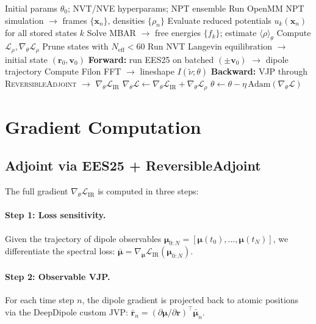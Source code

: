 \documentclass{article}
\newcommand{\RevAdj}{\textsc{ReversibleAdjoint}}
\begin{document}
\begin{algorithm}[t]
\caption{IR-Spectrum Force-Field Fitting}
\label{alg:training}
\begin{algorithmic}[1]
\Require Initial params $\theta_0$; NVT/NVE hyperparams; NPT ensemble
  \State Run OpenMM NPT simulation $\to$ frames $\{\bm{x}_n\}$, densities $\{\rho_n\}$
  \State Evaluate reduced potentials $u_k(\bm{x}_n)$ for all stored states $k$
  \State Solve MBAR $\to$ free energies $\{f_k\}$; estimate $\langle\rho\rangle_\theta$
  \State Compute $\mathcal{L}_\rho, \nabla_\theta\mathcal{L}_\rho$
  \State Prune states with $N_\mathrm{eff} < 60$
  \State Run NVT Langevin equilibration $\to$ initial state $(\bm{r}_0, \bm{v}_0)$
  \State \textbf{Forward:} run EES25 on batched $(\pm\bm{v}_0)$ $\to$ dipole trajectory
  \State Compute Filon FFT $\to$ lineshape $I(\tilde\nu;\theta)$
  \State \textbf{Backward:} VJP through \RevAdj{} $\to$ $\nabla_\theta\mathcal{L}_\mathrm{IR}$
  \State $\nabla_\theta\mathcal{L} \gets \nabla_\theta\mathcal{L}_\mathrm{IR}
         + \nabla_\theta\mathcal{L}_\rho$
  \State $\theta \gets \theta - \eta\,\mathrm{Adam}(\nabla_\theta\mathcal{L})$
\EndFor
\end{algorithmic}
\end{algorithm}

\section{Gradient Computation}
\label{sec:gradient}

\subsection{Adjoint via EES25 + ReversibleAdjoint}

The full gradient $\nabla_\theta \mathcal{L}_\mathrm{IR}$ is computed in three
steps:

\paragraph{Step 1: Loss sensitivity.}
Given the trajectory of dipole observables
$\bm{\mu}_{0:N} = [\bm{\mu}(t_0), \ldots, \bm{\mu}(t_N)]$, we differentiate
the spectral loss:
$\bar{\bm{\mu}} = \nabla_{\bm{\mu}}\mathcal{L}_\mathrm{IR}(\bm{\mu}_{0:N})$.

\paragraph{Step 2: Observable VJP.}
For each time step $n$, the dipole gradient is projected back to atomic
positions via the DeepDipole custom JVP:
$\bar{\bm{r}}_n = (\partial\bm{\mu}/\partial\bm{r})^\top \bar{\bm{\mu}}_n$.
\end{document}
